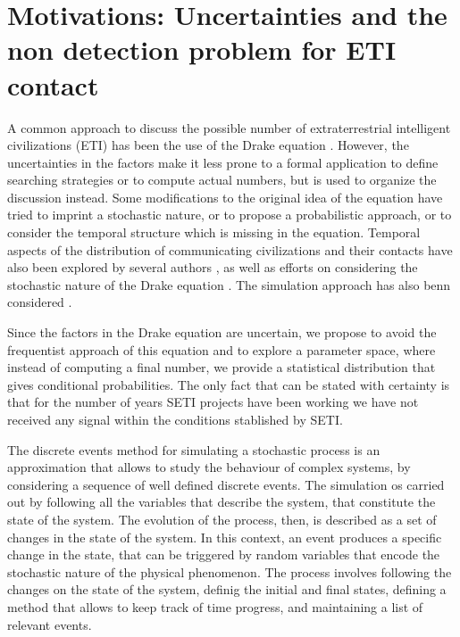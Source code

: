 \documentclass[crop]{CSLB}%
\begin{document}
\Fpagebreak

\section{Motivations: Uncertainties and the non detection problem for
ETI contact}

A common approach to discuss the possible number of extraterrestrial
intelligent civilizations (ETI) has been the use of the Drake equation
\citep{Gleiser2010, Prantzos2013, Haqq-Misra2017}.
%
However, the uncertainties in the factors make it less prone to a
formal application to define searching strategies or to compute
actual numbers, but is used to organize the discussion instead.
%
Some modifications to the original idea of the equation have tried to
imprint a stochastic nature, or to propose a probabilistic approach,
or to consider the temporal structure which is missing in the
equation.
%
Temporal aspects of the distribution of communicating civilizations
and their contacts have also been explored by several authors
\citep{Fogg1987, Forgan2011, Balbi2018},
%
as well as efforts on considering the stochastic nature of the Drake equation
\citep{Glade2011}.
%
The simulation approach has also benn considered
\citep{Forgan2008, Forgan2010}.



Since the factors in the Drake equation are uncertain, we propose to
avoid the frequentist approach of this equation
and to explore a parameter space, where instead of computing a final
number, we provide a statistical distribution that gives conditional
probabilities.
%
The only fact that can be stated with certainty is that for the number
of years SETI projects have been working we have not received any
signal within the conditions stablished by SETI.



The discrete events method for simulating a stochastic process is an
approximation that allows to study the behaviour of complex
systems, by considering a sequence of well defined discrete events.
%
The simulation os carried out by following all the variables that
describe the system, that constitute the state of the system.
%
The evolution of the process, then, is described as a set of changes
in the state of the system.
%
In this context, an event produces a specific change in the state,
that can be triggered by random variables that encode the stochastic
nature of the physical phenomenon.
%
The process involves following the changes on the state of the system,
definig the initial and final states, defining a method that allows to
keep track of time progress, and maintaining a list of relevant
events.
\end{document}
